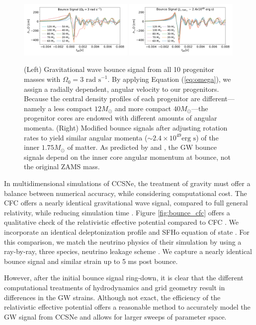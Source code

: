 \documentclass[twocolumn,times]{aastex62}  %
\begin{document}
\begin{figure}[t]
  \centering     %
  \includegraphics[width=0.49\textwidth]{figures/hd3_bounce_test.pdf}
  \includegraphics[width=0.49\textwidth]{figures/hdj_bounce_final.pdf}
  \caption{(Left) Gravitational wave bounce signal from all 10 progenitor masses with $\Omega_0 = 3 \text{ rad s}^{-1}$.  By applying Equation (\ref{eq:omega}), we assign a radially dependent, angular velocity to our progenitors.  Because the central density profiles of each progenitor are different---namely a less compact $12 M_\odot$ and more compact $40 M_\odot$---the progenitor cores are endowed with different amounts of angular momenta.   (Right) Modified bounce signals after adjusting rotation rates to yield similar angular momenta ($\sim 2.4\times10^{49} \text{erg s}$) of the inner $1.75 M_\odot$ of matter.  As predicted by \citet{dimm:2008} and \citet{abdik:2010,abdik:2014}, the GW bounce signals depend on the inner core angular momentum at bounce, not the original ZAMS mass.}
  \label{fig:bounce}
\end{figure}

In multidimensional simulations of CCSNe, the treatment of gravity must offer a balance between numerical accuracy, while considering computational cost.   The CFC offers a nearly identical gravitational wave signal, compared to full general relativity, while reducing simulation time \citep{ott:2007}.  Figure \ref{fig:bounce_cfc} offers a qualitative check of the relativistic effective potential compared to CFC \citep{richers:2017}.  We incorporate an identical deleptonization profile \citep{lieb:2005} and SFHo equation of state \citep{steiner:2013}.  For this comparison, we match the neutrino physics of their simulation by using a ray-by-ray, three species, neutrino leakage scheme \citep{oconnor:2010,couch:2014}.  We capture a nearly identical bounce signal and similar strain up to 5 ms post bounce. \par
However, after the initial bounce signal ring-down, it is clear that the different computational treatments of hydrodynamics and grid geometry result in differences in the GW strains.  Although not exact, the efficiency of the relativistic effective potential offers a reasonable method to accurately model the GW signal from CCSNe and allows for larger sweeps of parameter space.
\end{document}
